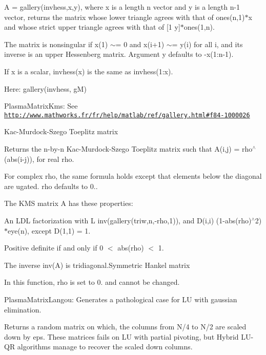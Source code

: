 A = gallery(\textquotesingle{}invhess\textquotesingle{},x,y), where x is a length n vector and y is a length n-\/1 vector, returns the matrix whose lower triangle agrees with that of ones(n,1)$\ast$x\textquotesingle{} and whose strict upper triangle agrees with that of \mbox{[}1 y\mbox{]}$\ast$ones(1,n).

The matrix is nonsingular if x(1) $\sim$= 0 and x(i+1) $\sim$= y(i) for all i, and its inverse is an upper Hessenberg matrix. Argument y defaults to -\/x(1\+:n-\/1).

If x is a scalar, invhess(x) is the same as invhess(1\+:x).

Here\+: gallery(\textquotesingle{}invhess\textquotesingle{}, g\+M)

\begin{DoxyItemize}
\item Plasma\+Matrix\+Kms\+: See \href{http://www.mathworks.fr/fr/help/matlab/ref/gallery.html#f84-1000026}{\tt http\+://www.\+mathworks.\+fr/fr/help/matlab/ref/gallery.\+html\#f84-\/1000026}\end{DoxyItemize}
Kac-\/\+Murdock-\/\+Szego Toeplitz matrix

Returns the n-\/by-\/n Kac-\/\+Murdock-\/\+Szego Toeplitz matrix such that A(i,j) = rho$^\wedge$(abs(i-\/j)), for real rho.

For complex rho, the same formula holds except that elements below the diagonal are ugated. rho defaults to 0..

The K\+M\+S matrix A has these properties\+:
\begin{DoxyItemize}
\item An L\+D\+L\textquotesingle{} factorization with L inv(gallery(\textquotesingle{}triw\textquotesingle{},n,-\/rho,1))\textquotesingle{}, and D(i,i) (1-\/abs(rho)$^\wedge$2)$\ast$eye(n), except D(1,1) = 1.
\item Positive definite if and only if 0 $<$ abs(rho) $<$ 1.
\item The inverse inv(\+A) is tridiagonal.\+Symmetric Hankel matrix
\end{DoxyItemize}

In this function, rho is set to 0. and cannot be changed.

\begin{DoxyItemize}
\item Plasma\+Matrix\+Langou\+: Generates a pathological case for L\+U with gaussian elimination.\end{DoxyItemize}
Returns a random matrix on which, the columns from N/4 to N/2 are scaled down by eps. These matrices fails on L\+U with partial pivoting, but Hybrid L\+U-\/\+Q\+R algorithms manage to recover the scaled down columns.

